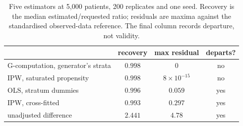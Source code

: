 \begin{table}[htbp]
\small
\centering
\caption{Five estimators at 5{,}000 patients, 200 replicates and one seed.
Recovery is the median estimated/requested ratio; residuals are maxima against
the standardised observed-data reference. The final column records departure,
not validity.}
\label{tab:trial}
\begin{tabular}{@{}lccc@{}}
\toprule
& \textbf{recovery} & \textbf{max residual}
& \textbf{departs?} \\
\midrule
G-computation, generator's strata & $0.998$ & $0$          & no \\
IPW, saturated propensity         & $0.998$ & $8\times10^{-15}$ & no \\
OLS, stratum dummies              & $0.996$ & $0.059$      & yes \\
IPW, cross-fitted                 & $0.993$ & $0.297$      & yes \\
unadjusted difference             & $2.441$ & $4.78$       & yes \\
\bottomrule
\end{tabular}
\end{table}
